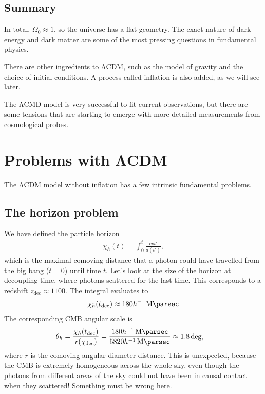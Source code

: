 \subsection*{Summary}
In total, $\Omega_0 \approx 1$, so the universe has a flat geometry. The exact nature of dark energy and dark matter are some of the most pressing questions in fundamental physics.

There are other ingredients to ΛCDM, such as the model of gravity and the choice of initial conditions. A process called inflation is also added, as we will see later.

The ΛCMD model is very successful to fit current observations, but there are some tensions that are starting to emerge with more detailed measurements from cosmological probes.



\section{Problems with ΛCDM}

The ΛCDM model without inflation has a few intrinsic fundamental problems.

\subsection{The horizon problem}
We have defined the particle horizon
\begin{align*}
	\chi_h(t) = \int_0^t \frac{c \dd{t'}}{a(t')},
\end{align*}
which is the maximal comoving distance that a photon could have travelled from the big bang ($t=0$) until time $t$. Let's look at the size of the horizon at decoupling time, where photons scattered for the last time. This corresponds to a redshift $z_\text{dec} \approx 1100$. The integral evaluates to
\begin{align*}
	\chi_h (t_\text{dec}) \approx 180 h^{-1} \, \si{\mega\parsec}
\end{align*}
The corresponding CMB angular scale is
\begin{align*}
	\theta_h
	&= \frac{\chi_h(t_\text{dec})}{r(\chi_\text{dec})} = \frac{180 h^{-1} \, \si{\mega\parsec}}{5820 h^{-1} \, \si{\mega\parsec}}
	\approx \SI{1.8}{\deg},
\end{align*}
where $r$ is the comoving angular diameter distance.
This is unexpected, because the CMB is extremely homogeneous across the whole sky, even though the photons from different areas of the sky could not have been in causal contact when they scattered! Something must be wrong here.

